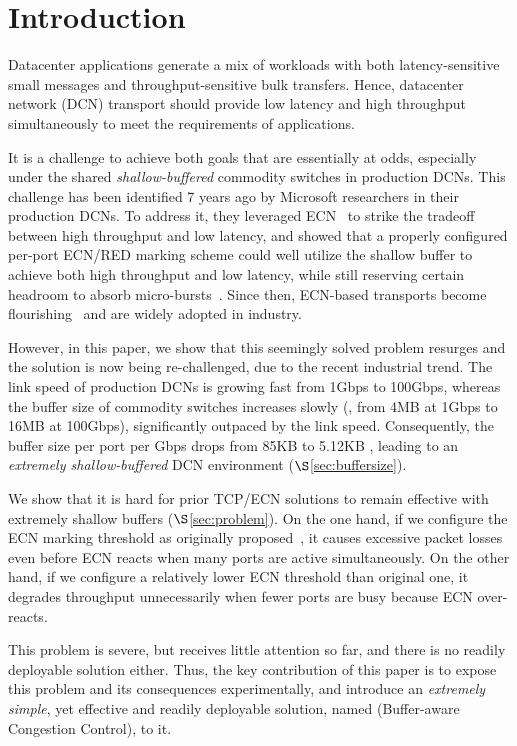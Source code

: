 \vspace{-5mm}
\section{Introduction}\label{sec:intro}
\vspace{-1mm}
Datacenter applications generate a mix of workloads with both latency-sensitive small messages and throughput-sensitive bulk transfers. Hence, datacenter network (DCN) transport should provide low latency and high throughput simultaneously to meet the requirements of applications.

It is a challenge to achieve both goals that are essentially at odds, especially under the shared \emph{shallow-buffered} commodity switches in production DCNs. This challenge has been identified 7 years ago by Microsoft researchers in their production DCNs. To address it, they leveraged ECN~\cite{ecn} to strike the tradeoff between high throughput and low latency, and showed that a properly configured per-port ECN/RED marking scheme could well utilize the shallow buffer to achieve both high throughput and low latency, while still reserving certain headroom to absorb micro-bursts~\cite{dctcp}. Since then, ECN-based transports become flourishing~\cite{dctcp,d2tcp,tuning,l2dct} and are widely adopted in industry.

However, in this paper, we show that this seemingly solved problem resurges and the solution is now being re-challenged, due to the recent industrial trend. The link speed of production DCNs is growing fast from 1Gbps to 100Gbps, whereas the buffer size of commodity switches increases slowly (\eg, from 4MB at 1Gbps to 16MB at 100Gbps), significantly outpaced by the link speed. Consequently, the buffer size per port per Gbps drops from 85KB to 5.12KB , leading to an \emph{extremely shallow-buffered} DCN environment ($\S$\ref{sec:buffersize}).

We show that it is hard for prior TCP/ECN solutions to remain effective with extremely shallow buffers ($\S$\ref{sec:problem}). On the one hand, if we configure the ECN marking threshold as originally proposed~\cite{dctcp,tuning}, it causes excessive packet losses even before ECN reacts when many ports are active simultaneously. On the other hand, if we configure a relatively lower ECN threshold than original one, it degrades throughput unnecessarily when fewer ports are busy because ECN over-reacts.

This problem is severe, but receives little attention so far, and there is no readily deployable solution either. Thus, the key contribution of this paper is to expose this problem and its consequences experimentally, and introduce an \emph{extremely simple}, yet effective and readily deployable solution, named \textbf{\sys} (Buffer-aware Congestion Control), to it.

